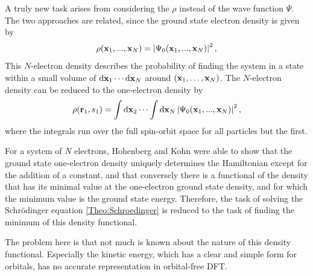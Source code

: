 \documentclass[8.5pt,twoside,twocolumn]{article}
\newcommand\di{\te{d}}
\renewcommand\r{\bo r}
\theoremstyle{standard}
\begin{document}
A truly new task arises from considering the  $\rho$ instead of the wave function
$\Psi$. The two approaches are related, since the ground state electron density is given by
\begin{equation}
 \rho(\mathbf{x}_1,...,\mathbf{x}_N)=\left|{\Psi_0(\mathbf{x}_1,...,\mathbf{x}_N)}\right|^2,
 \label{Theo:NElectronDensity}
\end{equation}
This $N$-electron density describes the probability of finding the system in a state within 
a small volume of $\di \x_1 \cdots \di \x_N$ around $(\mathbf{x}_1,\ldots,\mathbf{x}_N)$. 
The $N$-electron density can be reduced to the one-electron density by
\begin{equation}
 \rho(\r_1,s_1)=\int\di\x_2 \cdots \int\di \x_N \abs{\Psi_0(\x_1,...,\x_N)}^2,
 \label{Theo:1ElectronDensity}
\end{equation}
where the integrals run over %
the full spin-orbit space for all particles but the first.

For a system of $N$ electrons, Hohenberg and Kohn \cite{HohenbergKohn} were able to show that the ground state
one-electron density uniquely determines the Hamiltonian except for the addition of a constant,
and that conversely there is a functional of the density that has its minimal value at the one-electron
ground state density, and for which the minimum value is the ground state energy. Therefore, the task
of solving the Schrödinger equation \eqref{Theo:Schroedinger} is reduced to the task of finding
the minimum of this density functional.

The problem here is that not much is known about the nature of this density
functional. Especially the kinetic energy, which has a clear and simple form
for orbitals, has no accurate representation in orbital-free DFT.
\end{document}
